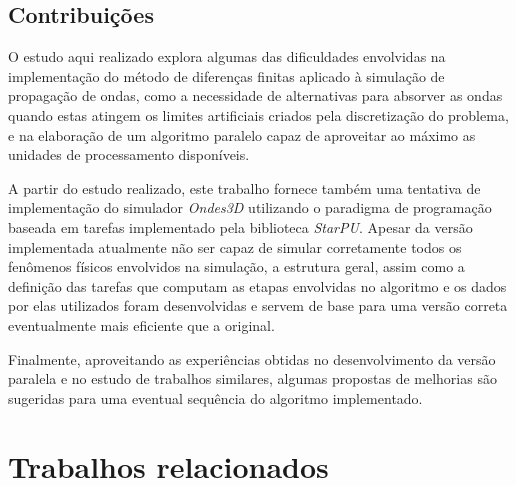 \documentclass[cic,tc]{iiufrgs}
\begin{document}
\section{Contribuições}

O estudo aqui realizado explora algumas das dificuldades envolvidas na implementação do método de diferenças finitas aplicado à simulação de propagação de ondas, como a necessidade
de alternativas para absorver as ondas quando estas atingem os limites artificiais criados pela discretização do problema, e na elaboração de um algoritmo paralelo capaz de aproveitar
ao máximo as unidades de processamento disponíveis.

A partir do estudo realizado, este trabalho fornece também uma tentativa de implementação do simulador \textit{Ondes3D} utilizando o paradigma de programação baseada em tarefas implementado
pela biblioteca \textit{StarPU}. Apesar da versão implementada atualmente não ser capaz de simular corretamente todos os fenômenos físicos envolvidos na simulação, a estrutura geral, assim como
a definição das tarefas que computam as etapas envolvidas no algoritmo e os dados por elas utilizados foram desenvolvidas e servem de base para uma versão correta eventualmente mais
eficiente que a original.

Finalmente, aproveitando as experiências obtidas no desenvolvimento da versão paralela e no estudo de trabalhos similares, algumas propostas de melhorias são sugeridas para uma
eventual sequência do algoritmo implementado.



\chapter{Trabalhos relacionados}\label{sec:related}
\end{document}
